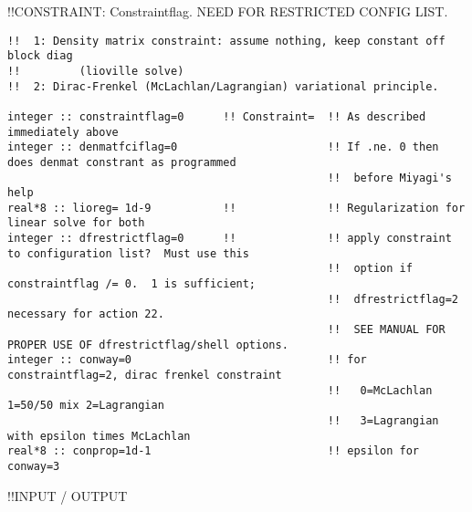 !!{\large \quad CONSTRAINT: Constraintflag. NEED FOR RESTRICTED CONFIG LIST.}
\begin{verbatim}
!!  1: Density matrix constraint: assume nothing, keep constant off block diag 
!!         (lioville solve)
!!  2: Dirac-Frenkel (McLachlan/Lagrangian) variational principle.

integer :: constraintflag=0      !! Constraint=  !! As described immediately above
integer :: denmatfciflag=0                       !! If .ne. 0 then does denmat constrant as programmed
                                                 !!  before Miyagi's help
real*8 :: lioreg= 1d-9           !!              !! Regularization for linear solve for both
integer :: dfrestrictflag=0      !!              !! apply constraint to configuration list?  Must use this
                                                 !!  option if constraintflag /= 0.  1 is sufficient;
                                                 !!  dfrestrictflag=2 necessary for action 22. 
                                                 !!  SEE MANUAL FOR PROPER USE OF dfrestrictflag/shell options.
integer :: conway=0                              !! for constraintflag=2, dirac frenkel constraint
                                                 !!   0=McLachlan 1=50/50 mix 2=Lagrangian
                                                 !!   3=Lagrangian with epsilon times McLachlan
real*8 :: conprop=1d-1                           !! epsilon for conway=3

\end{verbatim}
!!{\large \quad INPUT / OUTPUT }
